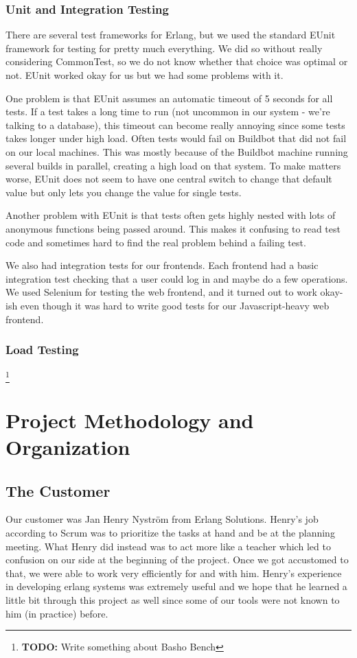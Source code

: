 \documentclass[11pt,a4paper]{report}
\newcommand{\todo}[1]{\footnote{{\color{red} {\bf TODO:} #1}}}
\begin{document}
\subsection{Unit and Integration Testing}
There are several test frameworks for Erlang, but we used the standard EUnit
framework for testing for pretty much everything. We did so without really
considering CommonTest, so we do not know whether that choice was optimal or
not. EUnit worked okay for us but we had some problems with it.

One problem is that EUnit assumes an automatic timeout of 5 seconds for all
tests. If a test takes a long time to run (not uncommon in our system - we're
talking to a database), this timeout can become really annoying since some tests
takes longer under high load. Often tests would fail on Buildbot that did not
fail on our local machines. This was mostly because of the Buildbot machine
running several builds in parallel, creating a high load on that system. To make
matters worse, EUnit does not seem to have one central switch to change that
default value but only lets you change the value for single tests.

Another problem with EUnit is that tests often gets highly nested with lots of
anonymous functions being passed around. This makes it confusing to read test
code and sometimes hard to find the real problem behind a failing test.

We also had integration tests for our frontends. Each frontend had a basic
integration test checking that a user could log in and maybe do a few
operations. We used Selenium for testing the web frontend, and it turned out to
work okay-ish even though it was hard to write good tests for our
Javascript-heavy web frontend.
\subsection{Load Testing}
\todo{Write something about Basho Bench}
\chapter{Project Methodology and Organization}

\section{The Customer}
Our customer was Jan Henry Nyström from Erlang Solutions. Henry's job according to
Scrum was to prioritize the tasks at hand and be at the planning meeting.
What Henry did instead was to act more like a teacher which led to confusion on
our side at the beginning of the project. Once we got accustomed to that,
we were able to work very efficiently for and with him.
Henry's experience in developing erlang systems was extremely useful and we hope
that he learned a little bit through this project as well since some of our
tools were not known to him (in practice) before.
\end{document}
